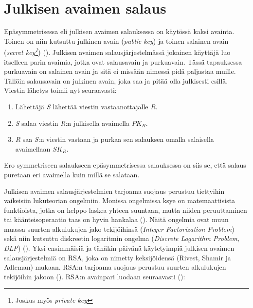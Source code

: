 
 \section{Julkisen avaimen salaus}
 Epäsymmetrisessa eli julkisen avaimen salauksessa on käytössä kaksi avainta. Toinen on niin kutsuttu julkinen avain (\emph{public key}) ja toinen salainen avain (\emph{secret key\footnote{Joskus myös \emph{private key}}}) (\cite{bellare2005introduction}). Julkisen avaimen salausjärjestelmässä jokainen käyttäjä luo itselleen parin avaimia, jotka ovat salausavain ja purkuavain. Tässä tapauksessa purkuavain on salainen avain ja sitä ei missään nimessä pidä paljastaa muille. Tällöin salausavain on julkinen avain, joka saa ja pitää olla julkisesti esillä. Viestin lähetys toimii nyt seuraavasti:
 
 \begin{enumerate}
     \item Lähettäjä \emph{S} lähettää viestin vastaanottajalle \emph{R}.
     \item \emph{S} salaa viestin \emph{R}:n julkisella avaimella $PK_{R}$.
     \item \emph{R} saa \emph{S}:n viestin vastaan ja purkaa sen salauksen omalla salaisella avaimellaan $SK_{R}$.
 \end{enumerate}
Ero symmetriseen salaukseen epäsymmetrisessa salauksessa on siis se, että salaus puretaan eri avaimella kuin millä se salataan.
 
  Julkisen avaimen salausjärjestelmien tarjoama suojaus perustuu tiettyihin vaikeisiin lukuteorian ongelmiin. Monissa ongelmissa ksye on matemaattisista funktioista, jotka on helppo laskea yhteen suuntaan, mutta niiden peruuttaminen tai käänteisoperaatio taas on hyvin hankalaa (\cite{mavroeidis2018impact}). Näitä ongelmia ovat muun muassa suurten alkulukujen jako tekijöihinsä (\emph{Integer Factorization Problem}) sekä niin kutsuttu diskreetin logaritmin ongelma (\emph{Discrete Logarithm Problem, DLP}) (\cite{10.1007/978-3-319-11659-4_15}).
  Yksi ensimmäisiä ja tänäkin päivänä käytetyimpiä julkisen avaimen salausjärjestelmiä on RSA, joka on nimetty keksijöidensä (Rivest, Shamir ja Adleman) mukaan. RSA:n tarjoama suojaus perustuu suurten alkulukujen tekijöihin jakoon (\cite{montgomery1994survey}). RSA:n avainpari luodaan seuraavasti  (\cite{doi:10.1080/23742917.2016.1226650}):
  
